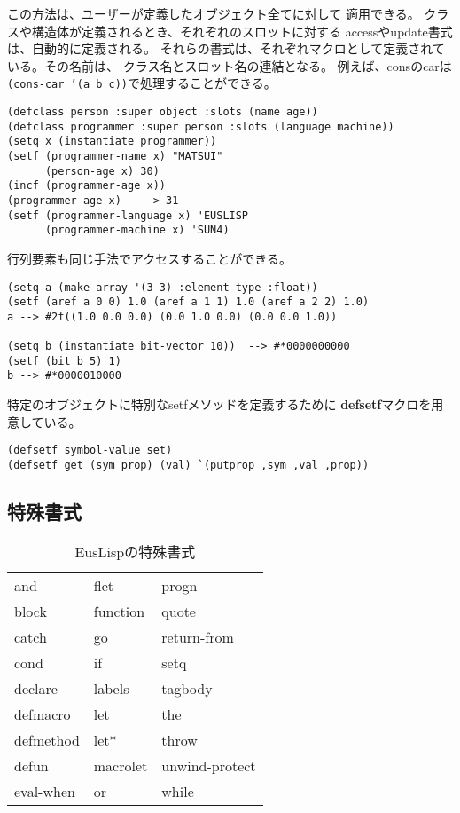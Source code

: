 この方法は、ユーザーが定義したオブジェクト全てに対して
適用できる。
クラスや構造体が定義されるとき、それぞれのスロットに対する
accessやupdate書式は、自動的に定義される。
それらの書式は、それぞれマクロとして定義されている。その名前は、
クラス名とスロット名の連結となる。
例えば、consのcarは{\tt (cons-car '(a b c))}で処理することができる。

\begin{verbatim}
(defclass person :super object :slots (name age))
(defclass programmer :super person :slots (language machine))
(setq x (instantiate programmer))
(setf (programmer-name x) "MATSUI"
      (person-age x) 30)
(incf (programmer-age x))
(programmer-age x)   --> 31
(setf (programmer-language x) 'EUSLISP
      (programmer-machine x) 'SUN4)
\end{verbatim}

行列要素も同じ手法でアクセスすることができる。

\begin{verbatim}
(setq a (make-array '(3 3) :element-type :float))
(setf (aref a 0 0) 1.0 (aref a 1 1) 1.0 (aref a 2 2) 1.0)
a --> #2f((1.0 0.0 0.0) (0.0 1.0 0.0) (0.0 0.0 1.0))

(setq b (instantiate bit-vector 10))  --> #*0000000000
(setf (bit b 5) 1)
b --> #*0000010000
\end{verbatim}

特定のオブジェクトに特別なsetfメソッドを定義するために
{\bf defsetf}マクロを用意している。

\begin{verbatim}
(defsetf symbol-value set)
(defsetf get (sym prop) (val) `(putprop ,sym ,val ,prop))
\end{verbatim}

\subsection{特殊書式}

\begin{table}
\caption{\label{SpecialForms}EusLispの特殊書式}
\begin{center}
{\large
\begin{tabular}{|l l l|} \hline 
and & flet & progn \\
block & function & quote\\
catch & go & return-from\\
cond & if & setq\\
declare & labels & tagbody\\
defmacro & let & the\\
defmethod & let* & throw\\
defun & macrolet & unwind-protect\\
eval-when & or & while\\
\hline
\end{tabular} }
\end{center}
\end{table}

